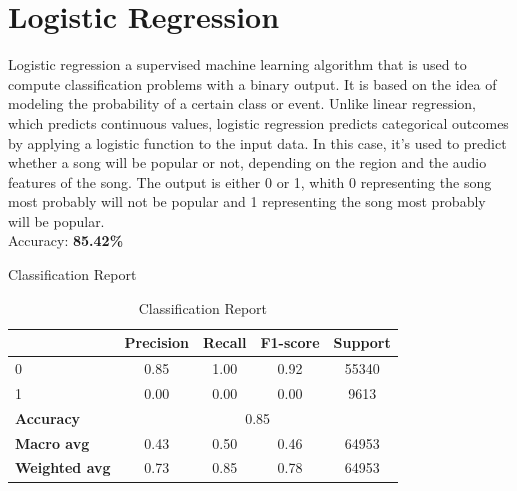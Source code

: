 \newpage


\section{Logistic Regression}
Logistic regression a supervised machine learning algorithm that is used to
compute classification problems with a binary output.
It is based on the idea of modeling the probability of a certain class or event.
Unlike linear regression, which predicts continuous values, logistic regression predicts categorical outcomes by applying a logistic function to the input data.
In this case, it's used to predict
whether a song will be popular or not, depending on the region and the 
audio features of the song. The output is
either 0 or 1, whith 0 representing the song most probably will not be popular and 
1 representing the song most probably will be popular. \\



Accuracy: \textbf{85.42\%}


Classification Report
\begin{table}[h]
    \centering
    \begin{tabular}{lcccc}
        \toprule
        & \textbf{Precision} & \textbf{Recall} & \textbf{F1-score} & \textbf{Support} \\
        \midrule
        0 & 0.85 & 1.00 & 0.92 & 55340 \\
        1 & 0.00 & 0.00 & 0.00 & 9613 \\
        \midrule
        \textbf{Accuracy} & \multicolumn{4}{c}{0.85} \\
        \textbf{Macro avg} & 0.43 & 0.50 & 0.46 & 64953 \\
        \textbf{Weighted avg} & 0.73 & 0.85 & 0.78 & 64953 \\
        \bottomrule
    \end{tabular}
    \caption{Classification Report}
    \label{tab:classification_report}
\end{table}

